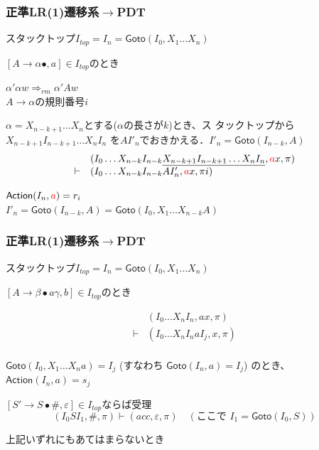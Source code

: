 \documentclass[dvipdfmx,cjk]{beamer}
\begin{document}
\begin{frame}
  \frametitle{正準LR(1)遷移系$\rightarrow$PDT}
  スタックトップ$I_{top}=I_n=\mathsf{Goto}(I_0,X_1\ldots X_n)$
  \begin{trivlist}
    \item [{\bf 還元(Reduce)}]
    $[A\rightarrow\alpha\bullet,a]\in I_{top}$のとき

    $\alpha'\alpha w\Rightarrow_{rm}\alpha'Aw$\\
    $A\rightarrow\alpha$の規則番号$i$

    $\alpha=X_{n-k+1}\ldots X_n$とする($\alpha$の長さが$k$)とき、ス
    タックトップから\\
    $X_{n-k+1}I_{n-k+1}\ldots X_n I_n$
    を$AI'_n$でおきかえる．$I'_n=\mathsf{Goto}(I_{n-k},A)$
    \[
      \begin{array}{ll}
         & (I_0\ldots X_{n-k}I_{n-k}
        \underline{X_{n-k+1}I_{n-k+1}\ldots  X_nI_n},{\color{red}a}x,\pi) \\
        \vdash
         & (I_0\ldots X_{n-k}I_{n-k}A
        I'_n,{\color{red}a}x,\pi i)                              \\
      \end{array}
    \]


    $\mathsf{Action}(I_n,{\color{red}a})=r_i$\\
    $I'_n=\mathsf{Goto}(I_{n-k},A)=\mathsf{Goto}(I_0,X_1\ldots X_{n-k}A)$
  \end{trivlist}
\end{frame}

\begin{frame}
  \frametitle{正準LR(1)遷移系$\rightarrow$PDT}
  スタックトップ$I_{top}=I_n=\mathsf{Goto}(I_0,X_1\ldots X_n)$
  \begin{trivlist}
    \item [{\bf シフト(Shift)}]
    $[A\rightarrow\beta\bullet a\gamma,b]\in I_{top}$のとき

    \[
      \begin{array}{ll}
         & (I_0\ldots X_nI_n,ax,\pi)     \\
        \vdash
         & (I_0\ldots X_nI_naI_j,x,\pi) \\
      \end{array}
    \]

    $\mathsf{Goto}(I_0,X_1\ldots X_na)=I_j$ (すなわち $\mathsf{Goto}(I_n,a)=I_j$) のとき、
    $\mathsf{Action}(I_n,a)=s_j$
    \item [{\bf 受理(Accept)}]
    $[S'\rightarrow S\bullet\#,\varepsilon]\in I_{top}$ならば受理
    \[
      (I_0SI_1,\#,\pi)\vdash(acc,\varepsilon,\pi) \quad (\mbox{ここで } I_1=\mathsf{Goto}(I_0,S))
    \]
    \item [{\bf 誤り(Error)}]
    上記いずれにもあてはまらないとき
  \end{trivlist}
\end{frame}
\end{document}
